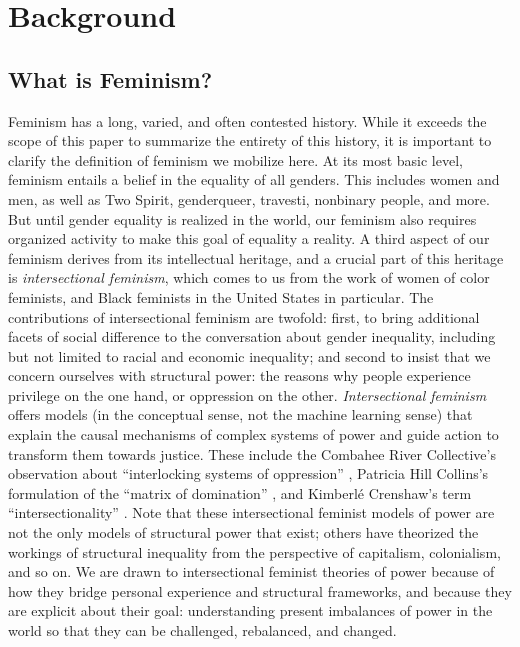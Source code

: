 \section{Background}

\subsection{What is Feminism?}
Feminism has a long, varied, and often contested history. While it exceeds the scope of this paper to summarize the entirety of this history, it is important to clarify the definition of feminism we mobilize here. At its most basic level, feminism entails a belief in the equality of all genders. This includes women and men, as well as Two Spirit, genderqueer, travesti, nonbinary people, and more. But until gender equality is realized in the world, our feminism also requires organized activity to make this goal of equality a reality. A third aspect of our feminism derives from its intellectual heritage, and a crucial part of this heritage is \textit{intersectional feminism}, which comes to us from the work of women of color feminists, and Black feminists in the United States in particular. The contributions of intersectional feminism are twofold: first, to bring additional facets of social difference to the conversation about gender inequality, including but not limited to racial and economic inequality; and second to insist that we concern ourselves with structural power: the reasons why people experience privilege on the one hand, or oppression on the other. \textit{Intersectional feminism} offers models (in the conceptual sense, not the machine learning sense) that explain the causal mechanisms of complex systems of power and guide action to transform them towards justice. These include the Combahee River Collective’s observation about “interlocking systems of oppression” \cite{Combahee}, Patricia Hill Collins’s formulation of the “matrix of domination” \cite{Hill_Collins_2000}, and Kimberlé Crenshaw’s term “intersectionality” \cite{Crenshaw}. Note that these intersectional feminist models of power are not the only models of structural power that exist; others have theorized the workings of structural inequality from the perspective of capitalism, colonialism, and so on. We are drawn to intersectional feminist theories of power because of how they bridge personal experience and structural frameworks, and because they are explicit about their goal: understanding present imbalances of power in the world so that they can be challenged, rebalanced, and changed.  

